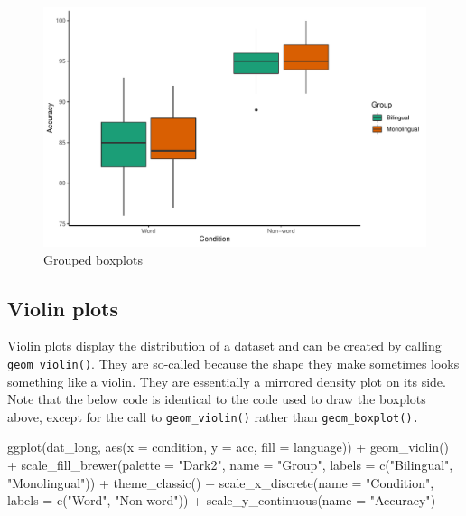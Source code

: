 \documentclass[
  english,
  doc,floatsintext]{apa6}
\newenvironment{Shaded}{\begin{snugshade}}{\end{snugshade}}
\newcommand{\AttributeTok}[1]{\textcolor[rgb]{0.77,0.63,0.00}{#1}}
\newcommand{\FunctionTok}[1]{\textcolor[rgb]{0.00,0.00,0.00}{#1}}
\newcommand{\NormalTok}[1]{#1}
\newcommand{\SpecialCharTok}[1]{\textcolor[rgb]{0.00,0.00,0.00}{#1}}
\newcommand{\StringTok}[1]{\textcolor[rgb]{0.31,0.60,0.02}{#1}}
\begin{document}
\begin{figure}

{\centering \includegraphics[width=1\linewidth]{images/boxplot3-1} 

}

\caption{Grouped boxplots}\label{fig:boxplot3}
\end{figure}

\hypertarget{violin-plots}{%
\subsection{Violin plots}\label{violin-plots}}

Violin plots display the distribution of a dataset and can be created by calling \texttt{geom\_violin()}. They are so-called because the shape they make sometimes looks something like a violin. They are essentially a mirrored density plot on its side. Note that the below code is identical to the code used to draw the boxplots above, except for the call to \texttt{geom\_violin()} rather than \texttt{geom\_boxplot().}

\begin{Shaded}
\begin{Highlighting}[]
\FunctionTok{ggplot}\NormalTok{(dat\_long, }\FunctionTok{aes}\NormalTok{(}\AttributeTok{x =}\NormalTok{ condition, }\AttributeTok{y =}\NormalTok{ acc, }\AttributeTok{fill =}\NormalTok{ language)) }\SpecialCharTok{+}
  \FunctionTok{geom\_violin}\NormalTok{() }\SpecialCharTok{+}
  \FunctionTok{scale\_fill\_brewer}\NormalTok{(}\AttributeTok{palette =} \StringTok{"Dark2"}\NormalTok{,}
                    \AttributeTok{name =} \StringTok{"Group"}\NormalTok{,}
                    \AttributeTok{labels =} \FunctionTok{c}\NormalTok{(}\StringTok{"Bilingual"}\NormalTok{, }\StringTok{"Monolingual"}\NormalTok{)) }\SpecialCharTok{+}
  \FunctionTok{theme\_classic}\NormalTok{() }\SpecialCharTok{+}
  \FunctionTok{scale\_x\_discrete}\NormalTok{(}\AttributeTok{name =} \StringTok{"Condition"}\NormalTok{,}
                   \AttributeTok{labels =} \FunctionTok{c}\NormalTok{(}\StringTok{"Word"}\NormalTok{, }\StringTok{"Non{-}word"}\NormalTok{)) }\SpecialCharTok{+}
  \FunctionTok{scale\_y\_continuous}\NormalTok{(}\AttributeTok{name =} \StringTok{"Accuracy"}\NormalTok{)}
\end{Highlighting}
\end{Shaded}
\end{document}
